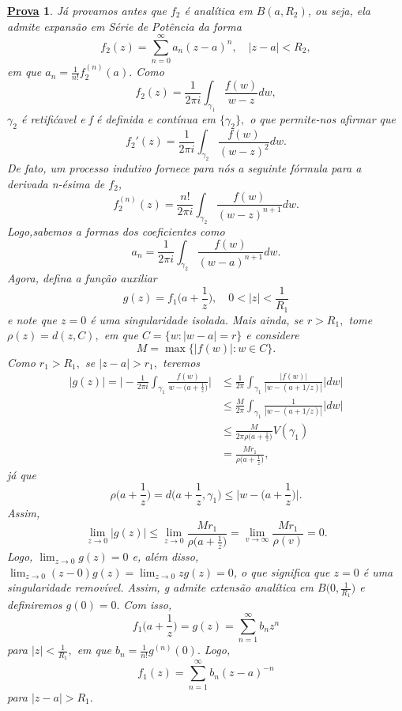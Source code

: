 \documentclass{article}
\newtheorem*{proof*}{\underline{Prova}}
\begin{document}
\begin{proof*}
    Já provamos antes que \(f_{2}\) é analítica em \(B(a, R_{2})\), ou seja, ela admite expansão em Série de Potência da forma 
    \[
      f_{2}(z) = \sum\limits_{n=0}^{\infty}a_{n}(z-a)^{n},\quad |z-a| < R_{2},
    \]
    em que \(a_{n} = \frac{1}{n!}f_{2}^{(n)}(a).\) Como 
    \[
      f_{2}(z) = \frac{1}{2\pi i}\int_{\gamma _{1}}^{}\frac{f(w)}{w-z}dw,
    \]
    \(\gamma _{2}\) é retifićavel e f é definida e contínua em \(\{\gamma_{2}\},\) o que permite-nos afirmar que 
    \[
      f_{2}'(z) = \frac{1}{2\pi i}\int_{\gamma_{2}}^{}\frac{f(w)}{(w-z)^{2}}dw.
    \]
    De fato, um processo indutivo fornece para nós a seguinte fórmula para a derivada n-ésima de \(f_{2}\),
    \[
      f_{2}^{(n)}(z) = \frac{n!}{2\pi i}\int_{\gamma _{2}}^{}\frac{f(w)}{(w-z)^{n+1}}dw.
    \]
    Logo,sabemos a formas dos coeficientes como 
    \[
      a_{n} = \frac{1}{2\pi i}\int_{\gamma _{2}}^{}\frac{f(w)}{(w-a)^{n+1}}dw.
    \]
    Agora, defina a função auxiliar 
    \[
      g(z) = f_{1}\biggl(a + \frac{1}{z}\biggr),\quad 0 < |z| < \frac{1}{R_{1}}
    \]
    e note que \(z=0\) é uma singularidade isolada. Mais ainda, se \(r > R_{1},\) tome \(\rho (z) = d(z, C),\)
    em que \(C = \{w: |w-a| = r\}\) e considere 
    \[
      M = \max\{|f(w)|: w\in C\}.
    \]
    Como \(r_{1} >  R_{1},\) se \(|z-a| > r_{1},\) teremos 
    \begin{align*}
      |g(z)| = \biggl|-\frac{1}{2\pi i}\int_{\gamma _{1}}^{}\frac{f(w)}{w-\bigl(a + \frac{1}{z}\bigr)}\biggr|&\leq \frac{1}{2\pi }\int_{\gamma _{1}}^{}\frac{|f(w)|}{|w - (a+1/z)|}|dw|\\
                                                                                                             &\leq \frac{M}{2\pi }\int_{\gamma _{1}}^{}\frac{1}{|w-(a+1/z)|}|dw|\\
                                                                                                             &\leq \frac{M}{2\pi \rho \bigl(a+\frac{1}{z}\bigr)}V(\gamma _{1}) \\
                                                                                                             &= \frac{Mr_{1}}{\rho \bigl(a + \frac{1}{z}\bigr)},
    \end{align*}
    já que 
    \[
      \rho \biggl(a + \frac{1}{z}\biggr) = d \biggl(a + \frac{1}{z}, \gamma _{1}\biggr) \leq \biggl\vert w-\biggl(a + \frac{1}{z}\biggr)\biggr\vert.
    \]
    Assim,
    \[
      \lim_{z\to 0}|g(z)|\leq \lim_{z\to 0}\frac{Mr_{1}}{\rho \bigl(a + \frac{1}{z}\bigr)} = \lim_{v\to \infty}\frac{Mr_{1}}{\rho (v)}=0.
    \]
    Logo, \(\lim_{z\to 0}g(z) = 0\) e, além disso, \(\lim_{z\to 0}(z-0)g(z)=\lim_{z\to 0}zg(z) = 0\), o que significa que \(z=0\) é uma singularidade
    removível. Assim, g admite extensão analítica em \(B \biggl(0, \frac{1}{R_{1}}\biggr)\) e definiremos \(g(0) = 0.\) Com isso,
    \[
      f_{1}\biggl(a + \frac{1}{z}\biggr)=g(z) = \sum\limits_{n=1}^{\infty}b_{n}z^{n}
    \]
    para \(|z| < \frac{1}{R_{1}},\) em que \(b_{n} = \frac{1}{n!}g^{(n)}(0).\) Logo,
    \[
      f_{1}(z) = \sum\limits_{n=1}^{\infty}b_{n}(z-a)^{-n}
    \]
    para \(|z-a| > R_{1}.\) 


\end{proof*}
\end{document}
